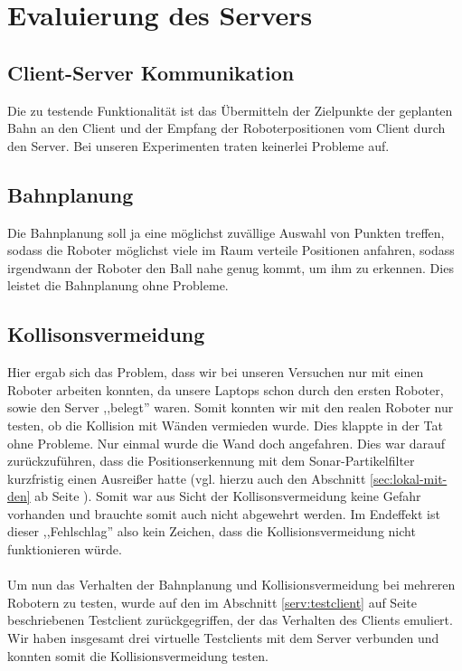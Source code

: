 \section{Evaluierung des Servers}
\label{sec:eval-des-serv}
%

%
\subsection{Client-Server Kommunikation}
Die zu testende Funktionalität ist das Übermitteln der Zielpunkte der
geplanten Bahn an den Client und der Empfang der Roboterpositionen vom
Client durch den Server. Bei unseren Experimenten traten keinerlei
Probleme auf. 
\subsection{Bahnplanung}
Die Bahnplanung soll ja eine möglichst zuvällige Auswahl von Punkten
treffen, sodass die Roboter möglichst viele im Raum verteile
Positionen anfahren, sodass irgendwann der Roboter den Ball nahe genug
kommt, um ihm zu erkennen. Dies leistet die Bahnplanung ohne Probleme.
\subsection{Kollisonsvermeidung}
Hier ergab sich das Problem, dass wir bei unseren Versuchen nur mit
einen Roboter arbeiten konnten, da unsere Laptops schon durch den
ersten Roboter, sowie den Server ,,belegt'' waren. Somit konnten wir
mit den realen Roboter nur testen, ob die Kollision mit Wänden
vermieden wurde. Dies klappte in der Tat ohne Probleme. Nur einmal
wurde die Wand doch angefahren. Dies war darauf zurückzuführen, dass
die Positionserkennung mit dem Sonar-Partikelfilter kurzfristig einen
Ausreißer hatte (vgl. hierzu auch den Abschnitt
\ref{sec:lokal-mit-den} ab Seite \pageref{sec:lokal-mit-den}). Somit
war aus Sicht der Kollisonsvermeidung keine Gefahr vorhanden und
brauchte somit auch nicht abgewehrt werden. Im Endeffekt ist dieser
,,Fehlschlag'' also kein Zeichen, dass die Kollisionsvermeidung nicht
funktionieren würde. \\\\
Um nun das Verhalten der Bahnplanung und Kollisionsvermeidung bei
mehreren Robotern zu testen, wurde auf den im Abschnitt
\ref{serv:testclient} auf Seite \pageref{serv:testclient}
beschriebenen Testclient zurückgegriffen, der das Verhalten des
Clients emuliert. Wir haben insgesamt drei virtuelle Testclients mit
dem Server verbunden und konnten somit die Kollisionsvermeidung testen.
%
